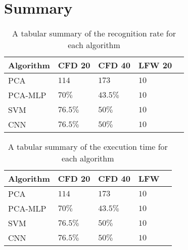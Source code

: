 \chapter{Summary}

\begin{table}[H]
	\centering
	\caption{A tabular summary of the recognition rate for each algorithm}
    \begin{tabular}{ | l | l | l | l | l |}
    \hline
    \rowcolor{lightgray}
    Algorithm &  CFD 20 & CFD 40 & LFW 20 \\ \hline
    PCA &  $114$  & $173$ & $10$\\ \hline
	PCA-MLP & $70\%$ & $43.5\%$ & $10$ \\ \hline
    SVM & $76.5\%$ & $50\%$ & $10$ \\ \hline
    CNN & $76.5\%$ & $50\%$ & $10$ \\
    \hline
    \end{tabular}
\end{table}

\begin{table}[H]
	\centering
	\caption{A tabular summary of the execution time for each algorithm}
    \begin{tabular}{ | l | l | l | l | l |}
    \hline
    \rowcolor{lightgray}
    Algorithm &  CFD 20 & CFD 40 & LFW \\ \hline
    PCA &  $114$  & $173$ & $10$ \\ \hline
	PCA-MLP & $70\%$ & $43.5\%$ & $10$ \\ \hline
    SVM & $76.5\%$ & $50\%$ & $10$\\ \hline
    CNN & $76.5\%$ & $50\%$ & $10$\\
    \hline
    \end{tabular}
\end{table}